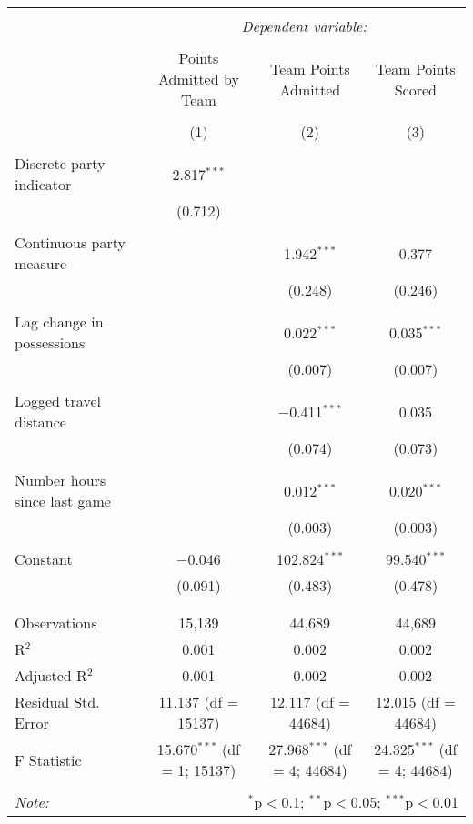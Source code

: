 \documentclass[letterpaper,12pt]{article}
\begin{document}
\hspace{-125pt}
\begin{tabular}{@{\extracolsep{5pt}}lccc}  \\[-1.8ex]\hline  \hline \\[-1.8ex]   & \multicolumn{3}{c}{\textit{Dependent variable:}} \\  \cline{2-4}  \\[-1.8ex] & Points Admitted by Team & Team Points Admitted & Team Points Scored \\  \\[-1.8ex] & (1) & (2) & (3)\\  \hline \\[-1.8ex]   Discrete party indicator & 2.817$^{***}$ &  &  \\    & (0.712) &  &  \\    & & & \\   Continuous party measure &  & 1.942$^{***}$ & 0.377 \\    &  & (0.248) & (0.246) \\    & & & \\   Lag change in possessions &  & 0.022$^{***}$ & 0.035$^{***}$ \\    &  & (0.007) & (0.007) \\    & & & \\   Logged travel distance &  & $-$0.411$^{***}$ & 0.035 \\    &  & (0.074) & (0.073) \\    & & & \\   Number hours since last game &  & 0.012$^{***}$ & 0.020$^{***}$ \\    &  & (0.003) & (0.003) \\    & & & \\   Constant & $-$0.046 & 102.824$^{***}$ & 99.540$^{***}$ \\    & (0.091) & (0.483) & (0.478) \\    & & & \\  \hline \\[-1.8ex]  Observations & 15,139 & 44,689 & 44,689 \\  R$^{2}$ & 0.001 & 0.002 & 0.002 \\  Adjusted R$^{2}$ & 0.001 & 0.002 & 0.002 \\  Residual Std. Error & 11.137 (df = 15137) & 12.117 (df = 44684) & 12.015 (df = 44684) \\  F Statistic & 15.670$^{***}$ (df = 1; 15137) & 27.968$^{***}$ (df = 4; 44684) & 24.325$^{***}$ (df = 4; 44684) \\  \hline  \hline \\[-1.8ex]  \textit{Note:}  & \multicolumn{3}{r}{$^{*}$p$<$0.1; $^{**}$p$<$0.05; $^{***}$p$<$0.01} \\  \end{tabular}  
\end{document}
